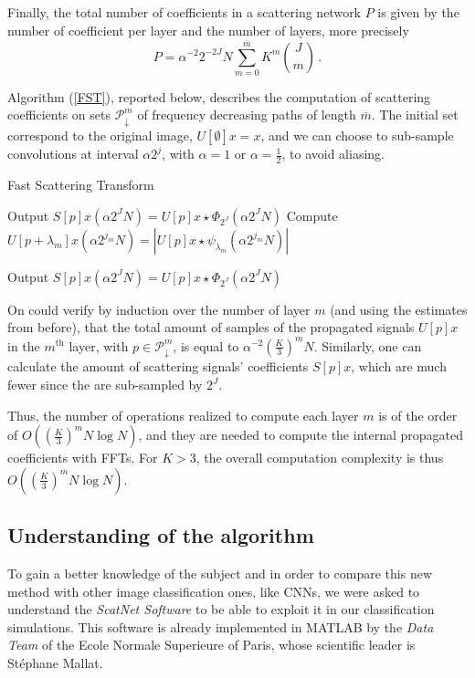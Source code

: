\documentclass[12pt,a4paper]{article}
\theoremstyle{remark}
\begin{document}
Finally, the total number of coefficients in a scattering network $P$ is given by the number of coefficient per layer and the number of layers, more precisely
\begin{equation*}
P= \alpha^{-2} 2^{-2J} N \sum_{m=0}^{\overline{m}} K^{m} {{J}\choose{m}} \,.
\end{equation*}

Algorithm (\ref{FST}), reported below, describes the computation of scattering coefficients on sets $\mathcal{P}_{\downarrow}^{m}$ of frequency decreasing paths of length $\overline{m}$. The initial set correspond to the original image, $U[\emptyset]x=x$, and we can choose to sub-sample convolutions at interval $\alpha2^j$, with $\alpha=1$ or $\alpha=\frac{1}{2}$, to avoid aliasing.

\begin{algorithm}
	\caption{Fast Scattering Transform}\label{FST}
	\begin{algorithmic}[1]
		\Procedure{}{}
		\State Output $S[p]x (\alpha 2^J N) = U[p]x \star \Phi_{2^J}(\alpha 2^J N)$
		\EndFor
		\State Compute  $U[p+\lambda_m]x (\alpha 2^{j_m} N) = | U[p]x \star \psi_{\lambda_m}(\alpha 2^{j_m} N) |$ 
		\EndFor
		\EndFor
		
		\State Output $S[p]x (\alpha 2^J N) = U[p]x \star \Phi_{2^J}(\alpha 2^J N)$
		\EndFor
		\EndProcedure
	\end{algorithmic}
\end{algorithm}

On could verify by induction over the number of layer $m$ (and using the estimates from before), that the total amount of samples of the propagated signals $U[p]x$ in the $m^{\text{th}}$ layer, with $p \in \mathcal{P}_{\downarrow}^{m}$,  is equal to $\alpha^{-2} \left(\frac{K}{3}\right)^m N$. Similarly, one can calculate the amount of scattering signals' coefficients $S[p]x$, which are much fewer since the are sub-sampled by $2^J$.

Thus, the number of operations realized to compute each layer $m$ is of the order of $O( \left( \frac{K}{3}\right)^m N \log N)$, and they are needed to compute the internal propagated coefficients with FFTs. For $K>3$, the overall computation complexity is thus $O( \left( \frac{K}{3}\right)^{\overline{m}} N \log N)$.

\subsection{Understanding of the algorithm}
To gain a better knowledge of the subject and in order to compare this new method with other image classification ones, like CNNs, we were asked to understand the \textit{ScatNet Software} to be able to exploit it in our classification simulations. This software is already implemented in MATLAB by the \textit{Data Team} of the Ecole Normale Superieure of Paris, whose scientific leader is Stéphane Mallat.
\end{document}
